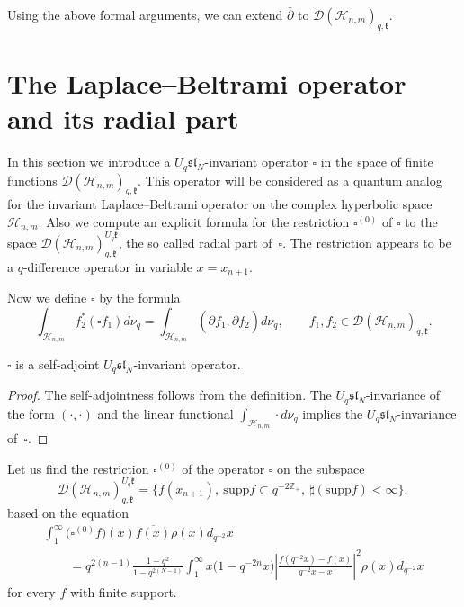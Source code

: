 Using the above formal arguments, we
can extend $\bar \partial$ to
$\mathscr{D}(\mathscr{H}_{n,m})_{q,\mathfrak{k}}$.


\section[The Laplace-Beltrami operator and its radial part]{The Laplace--Beltrami operator and its radial part}\label{sec_6}

In this section we introduce a $U_q \mathfrak{sl}_N$-invariant operator $\square$ in the space of f\/inite
functions $\mathscr{D}(\mathscr{H}_{n,m})_{q, \mathfrak{k}}$. This operator will be considered as a quantum
analog for the invariant Laplace--Beltrami operator on the complex hyperbolic space $\mathscr{H}_{n,m}$. Also
we compute an explicit formula for the restriction $\square^{(0)}$ of $\square$ to the space
$\mathscr{D}(\mathscr{H}_{n,m})_{q,\mathfrak{k}}^{U_q \mathfrak{k}}$, the so called radial part of~$\square$.
The restriction appears to be a $q$-dif\/ference operator in variable $x=x_{n+1}$.

Now we def\/ine $\square$ by the formula
\[
\int_{\mathscr{H}_{n,m}}f_2^* (\square f_1) d\nu_q=\int _{\mathscr{H}_{n,m}} (\bar \partial f_1, \bar
\partial f_2) d\nu_q, \qquad f_1,f_2 \in \mathscr{D}(\mathscr{H}_{n,m})_{q,\mathfrak{k}}.
\]

\begin{proposition}
$\square$ is a self-adjoint $U_q \mathfrak{sl}_N$-invariant operator.
\end{proposition}

\begin{proof} The self-adjointness follows from the def\/inition. The $U_q \mathfrak{sl}_N$-invariance of the
form $(\cdot,\cdot)$ and the linear functional $\int_{\mathscr{H}_{n,m}} \cdot d\nu_q$ implies the $U_q
\mathfrak{sl}_N$-invariance of~$\square$.
\end{proof}



Let us f\/ind the restriction $\square^{(0)}$ of the operator $\square$ on the subspace
\[
\mathscr{D}(\mathscr{H}_{n,m})_{q,\mathfrak{k}}^{U_q \mathfrak{k}}=\big\{ f(x_{n+1}), \ \mathrm{supp} f \subset q^{-2 \mathbb{Z}_+},\
\sharp (\mathrm{supp} f) < \infty \big\},
\]
based on the equation
\begin{gather*}
\int_1^\infty \big(\square^{(0)} f\big) (x) \overline{f(x)} \rho(x) d_{q^{-2}} x \\
\qquad{} = q^{2(n-1)}
\frac{1-q^2}{1-q^{2(N-1)}} \int_1^\infty x \big(1-q^{-2n} x\big) \left| \frac{f(q^{-2}x)-f(x)}{q^{-2}x - x}
\right|^2 \rho(x) d_{q^{-2}} x
\end{gather*}
for every $f$ with f\/inite support.


